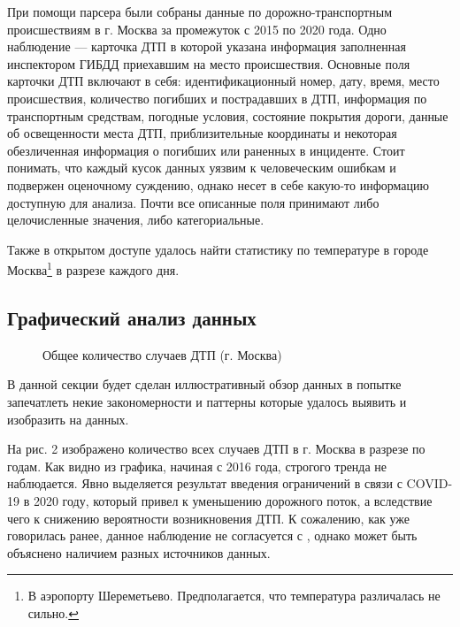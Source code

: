 \documentclass[a4paper, 14pt]{article}
\begin{document}
При помощи парсера были собраны данные по дорожно-транспортным происшествиям в г. Москва за промежуток с 2015 по 2020 года. Одно наблюдение --- карточка ДТП в которой указана информация заполненная инспектором ГИБДД приехавшим на место происшествия. Основные поля карточки ДТП включают в себя: идентификационный номер, дату, время, место происшествия, количество погибших и пострадавших в ДТП, информация по транспортным средствам, погодные условия, состояние покрытия дороги, данные об освещенности места ДТП, приблизительные координаты и некоторая обезличенная информация о погибших или раненных в инциденте. Стоит понимать, что каждый кусок данных уязвим к человеческим ошибкам и подвержен оценочному суждению, однако несет в себе какую-то информацию доступную для анализа. Почти все описанные поля принимают либо целочисленные значения, либо категориальные.

Также в открытом доступе удалось найти статистику по температуре в городе Москва\footnote{В аэропорту Шереметьево. Предполагается, что температура различалась не сильно.} в разрезе каждого дня. 

\subsection{Графический анализ данных}

\begin{figure}[h]
	\caption{Общее количество случаев ДТП (г. Москва)}
\end{figure}

В данной секции будет сделан иллюстративный обзор данных в попытке запечатлеть некие закономерности и паттерны которые удалось выявить и изобразить на данных. 

На рис. 2 изображено количество всех случаев ДТП в г. Москва в разрезе по годам. Как видно из графика, начиная с 2016 года, строгого тренда не наблюдается. Явно выделяется результат введения ограничений в связи с COVID-19 в 2020 году, который привел к уменьшению дорожного поток, а вследствие чего к снижению вероятности возникновения ДТП. К сожалению, как уже говорилась ранее, данное наблюдение не согласуется с \cite{rbkNews}, однако может быть объяснено наличием разных источников данных. 
\end{document}
